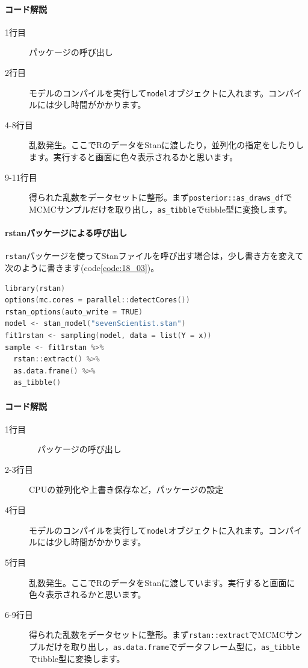 \documentclass{ltjsbook}
\begin{document}
\paragraph{コード解説}
\begin{description}
	\item[1行目] パッケージの呼び出し
	\item[2行目] モデルのコンパイルを実行して\texttt{model}オブジェクトに入れます。コンパイルには少し時間がかかります。
	\item[4-8行目] 乱数発生。ここでRのデータをStanに渡したり，並列化の指定をしたりします。実行すると画面に色々表示されるかと思います。
	\item[9-11行目] 得られた乱数をデータセットに整形。まず\verb|posterior::as_draws_df|でMCMCサンプルだけを取り出し，\verb|as_tibble|でtibble型に変換します。
\end{description}

\paragraph{rstanパッケージによる呼び出し}

\texttt{rstan}パッケージを使ってStanファイルを呼び出す場合は，少し書き方を変えて次のように書きます(code\ref{code:18_03})。

\begin{lstlisting}[language=C++,label={code:18_03},caption={rstanパッケージによる呼び出し}]
library(rstan)
options(mc.cores = parallel::detectCores())
rstan_options(auto_write = TRUE)
model <- stan_model("sevenScientist.stan")
fit1rstan <- sampling(model, data = list(Y = x))
sample <- fit1rstan %>%
  rstan::extract() %>%
  as.data.frame() %>%
  as_tibble()
\end{lstlisting}
\paragraph{コード解説}
\begin{description}
	\item[1行目]　パッケージの呼び出し
	\item[2-3行目] CPUの並列化や上書き保存など，パッケージの設定
	\item[4行目] モデルのコンパイルを実行して\texttt{model}オブジェクトに入れます。コンパイルには少し時間がかかります。
	\item[5行目] 乱数発生。ここでRのデータをStanに渡しています。実行すると画面に色々表示されるかと思います。
	\item[6-9行目] 得られた乱数をデータセットに整形。まず\texttt{rstan::extract}でMCMCサンプルだけを取り出し，\texttt{as.data.frame}でデータフレーム型に，\verb|as_tibble|でtibble型に変換します。
\end{description}
\end{document}
